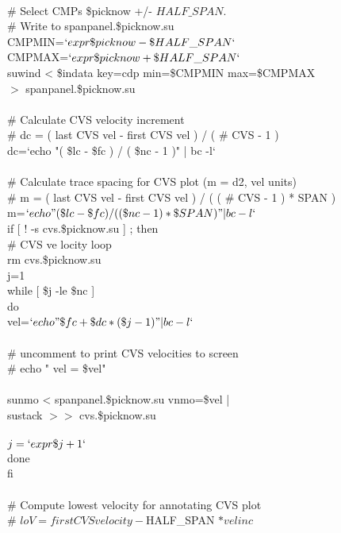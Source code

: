  \\
  \# Select CMPs \$picknow +/- $HALF\_SPAN.$  \\
  \# Write to  spanpanel.\$picknow.su \\
  CMPMIN=$`expr \$picknow - \$HALF\_SPAN`$ \\
  CMPMAX=$`expr \$picknow + \$HALF\_SPAN`$ \\
  suwind < \$indata key=cdp min=\$CMPMIN max=\$CMPMAX \ \\
  $>$ spanpanel.\$picknow.su \\
 \\
  \# Calculate CVS velocity increment \\
  \# dc = ( last CVS vel - first CVS vel ) / ( \# CVS - 1 ) \\
  dc=`echo "( \$lc - \$fc ) / ( \$nc - 1 )" | bc -l` \\
 \\
  \# Calculate trace spacing for CVS plot (m = d2, vel units) \\
  \# m = ( last CVS vel - first CVS vel ) / ( ( \# CVS - 1 ) * SPAN ) \\
  m=$`echo "( \$lc - \$fc ) / ( ( \$nc - 1 ) * \$SPAN )" | bc -l`$ \\
  if [ ! -s cvs.\$picknow.su  ] ; then \\
   \# CVS ve locity loop \\
    rm cvs.\$picknow.su \\
    j=1 \\
    while [ \$j -le \$nc ] \\
    do \\
      vel=$`echo "\$fc + \$dc * ( \$j - 1 )" | bc -l`$ \\
 \\
      \# uncomment to print CVS velocities to screen \\
      \#     echo " vel = \$vel" \\
 \\
      sunmo < spanpanel.\$picknow.su vnmo=\$vel | \\
      sustack $>>$ cvs.\$picknow.su \\
 \\
      $j=`expr \$j + 1`$ \\
    done \\
  fi \\
 \\
  \# Compute lowest velocity for annotating CVS plot \\
  \# $loV = first CVS velocity - $HALF\_SPAN $* vel inc $\\
